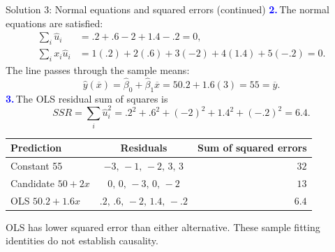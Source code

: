 \documentclass[notes,10pt, aspectratio=169]{beamer}
\newcommand{\answerpart}[1]{\textcolor{blue}{\textbf{#1.}}\,}
\begin{document}
\begin{frame}{Solution 3: Normal equations and squared errors (continued)}
\small
\answerpart{2}The normal equations are satisfied:
\begin{align*}
\sum_i\widehat u_i&=.2+.6-2+1.4-.2=0,\\
\sum_i x_i\widehat u_i&=1(.2)+2(.6)+3(-2)+4(1.4)+5(-.2)=0.
\end{align*}
The line passes through the sample means:
\[
\widehat y(\overline x)=\widehat\beta_0+\widehat\beta_1\overline x
=50.2+1.6(3)=55=\overline y.
\]
\answerpart{3}The OLS residual sum of squares is
\[
SSR=\sum_i\widehat u_i^2
=.2^2+.6^2+(-2)^2+1.4^2+(-.2)^2=\boxed{6.4}.
\]
\begin{center}
\begin{tabular}{l|c|r}
Prediction & Residuals & Sum of squared errors \\ \hline
Constant 55 & $-3,\,-1,\,-2,\,3,\,3$ & $32$ \\
Candidate $50+2x$ & $0,\,0,\,-3,\,0,\,-2$ & $13$ \\
OLS $50.2+1.6x$ & $.2,\,.6,\,-2,\,1.4,\,-.2$ & $6.4$
\end{tabular}
\end{center}
OLS has lower squared error than either alternative. These sample fitting identities do not establish causality.
\end{frame}
\fi
\end{document}
